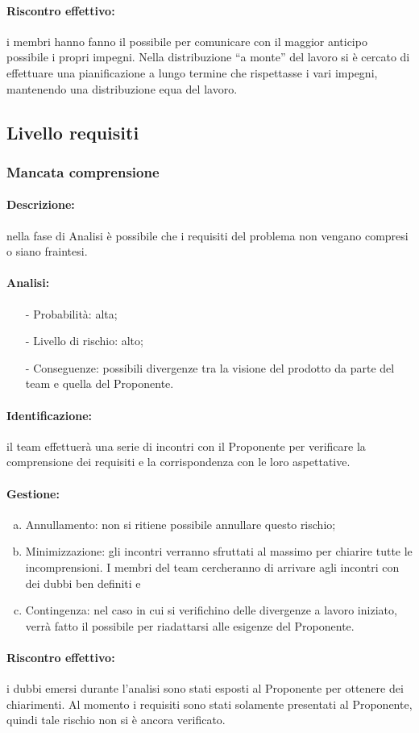 \documentclass[../PianoProgetto.tex]{subfiles}
\begin{document}
	\paragraph*{Riscontro effettivo:} i membri hanno fanno il possibile per comunicare con il maggior anticipo possibile i propri impegni. Nella distribuzione “a monte” del lavoro si è cercato di effettuare una pianificazione a lungo termine che rispettasse i vari impegni, mantenendo una distribuzione equa del lavoro.


\subsection{Livello requisiti}

\subsubsection{Mancata comprensione}

	\paragraph*{Descrizione:} nella fase di Analisi è possibile che i requisiti del problema non vengano compresi o siano fraintesi.
	
	\paragraph*{Analisi:}
	\begin{itemize}
		\item[-] Probabilità: alta;
		\item[-] Livello di rischio: alto;
		\item[-] Conseguenze: possibili divergenze tra la visione del prodotto da parte del team e quella del Proponente.
	\end{itemize}	
		
	\paragraph*{Identificazione:} il team effettuerà una serie di incontri con il Proponente per verificare la comprensione dei requisiti e la corrispondenza con le loro aspettative.
	
	\paragraph*{Gestione:}
	\begin{enumerate}[(a)]
		\item Annullamento: non si ritiene possibile annullare questo rischio;
		\item Minimizzazione: gli incontri verranno sfruttati al massimo per chiarire tutte le incomprensioni. I membri del team cercheranno di arrivare agli incontri con dei dubbi ben definiti e 
		\item Contingenza: nel caso in cui si verifichino delle divergenze a lavoro iniziato, verrà fatto il possibile per riadattarsi alle esigenze del Proponente.
	\end{enumerate}	
	
	\paragraph*{Riscontro effettivo:} i dubbi emersi durante l’analisi sono stati esposti al Proponente per ottenere dei chiarimenti. Al momento i requisiti sono stati solamente presentati al Proponente, quindi tale rischio non si è ancora verificato.

			
\end{document}
